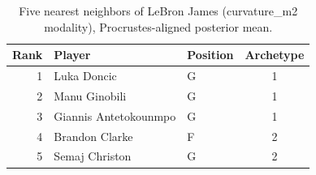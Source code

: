 \begin{table}[htbp]
  \centering\small
  \begin{tabular}{rllc}
    \toprule
    Rank & Player & Position & Archetype \\
    \midrule
    1 & Luka Doncic & G & 1 \\
    2 & Manu Ginobili & G & 1 \\
    3 & Giannis Antetokounmpo & G & 1 \\
    4 & Brandon Clarke & F & 2 \\
    5 & Semaj Christon & G & 2 \\
    \bottomrule
  \end{tabular}
  \caption{Five nearest neighbors of LeBron James (curvature_m2 modality), Procrustes-aligned posterior mean.}
  \label{tab:LeBron_James_neighbors_curvature_m2}
\end{table}

